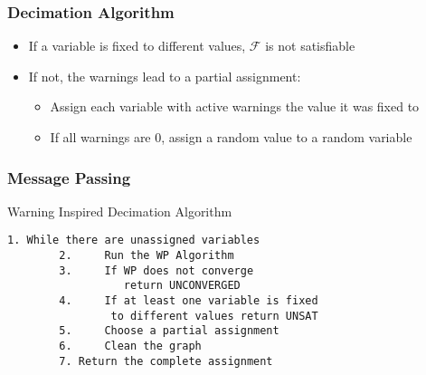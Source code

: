 \begin{frame}
	\frametitle{Decimation Algorithm}
	
	\begin{itemize}
		\item If a variable is fixed to different values, $\mathcal{F}$ is not satisfiable
		\item If not, the warnings lead to a partial assignment:
			\begin{itemize}
				\item Assign each variable with active warnings the value it was fixed to
				\item If all warnings are $0$, assign a random value to a random variable
			\end{itemize}
		
	\end{itemize}
\end{frame}

\begin{frame}[containsverbatim]
	\frametitle{Message Passing}
	Warning Inspired Decimation Algorithm
	\begin{lstlisting}[mathescape = true, gobble=15, basicstyle=\ttfamily]
		1. While there are unassigned variables
		2.     Run the WP Algorithm
		3.     If WP does not converge
		          return UNCONVERGED
		4.     If at least one variable is fixed
		        to different values return UNSAT
		5.     Choose a partial assignment
		6.     Clean the graph
		7. Return the complete assignment
	\end{lstlisting}
\end{frame}

